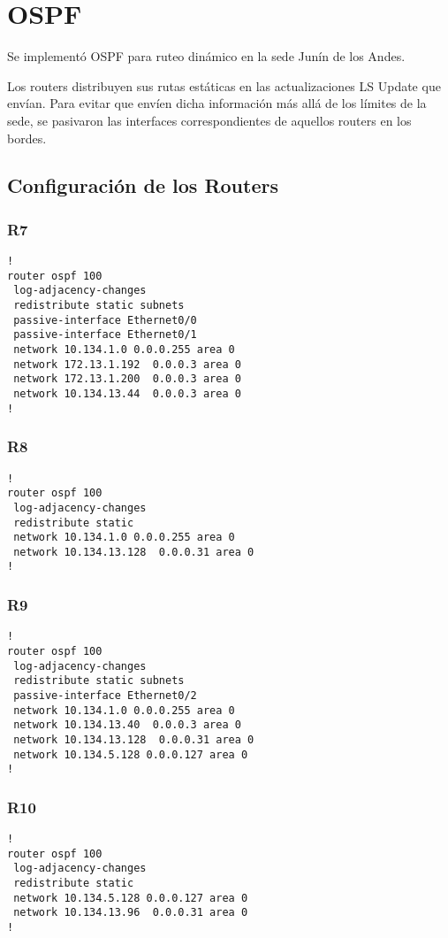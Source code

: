 \section{OSPF}
Se implementó OSPF para ruteo dinámico en la sede Junín de los Andes.

Los routers distribuyen sus rutas estáticas en las actualizaciones LS Update 
que envían.
Para evitar que envíen dicha información más allá de los límites de la sede, 
se pasivaron las interfaces correspondientes de aquellos routers en los bordes.

\subsection{Configuración de los Routers}
\subsubsection{R7}
{\small
\begin{verbatim}
!
router ospf 100
 log-adjacency-changes
 redistribute static subnets
 passive-interface Ethernet0/0
 passive-interface Ethernet0/1
 network 10.134.1.0 0.0.0.255 area 0
 network 172.13.1.192  0.0.0.3 area 0
 network 172.13.1.200  0.0.0.3 area 0
 network 10.134.13.44  0.0.0.3 area 0
!
\end{verbatim}
}

\subsubsection{R8}
{\small
\begin{verbatim}
!
router ospf 100
 log-adjacency-changes
 redistribute static
 network 10.134.1.0 0.0.0.255 area 0
 network 10.134.13.128  0.0.0.31 area 0
!
\end{verbatim}
}

\subsubsection{R9}
{\small
\begin{verbatim}
!
router ospf 100
 log-adjacency-changes
 redistribute static subnets
 passive-interface Ethernet0/2
 network 10.134.1.0 0.0.0.255 area 0
 network 10.134.13.40  0.0.0.3 area 0
 network 10.134.13.128  0.0.0.31 area 0
 network 10.134.5.128 0.0.0.127 area 0
!
\end{verbatim}
}

\subsubsection{R10}
{\small
\begin{verbatim}
!
router ospf 100
 log-adjacency-changes
 redistribute static
 network 10.134.5.128 0.0.0.127 area 0
 network 10.134.13.96  0.0.0.31 area 0
!
\end{verbatim}
}

